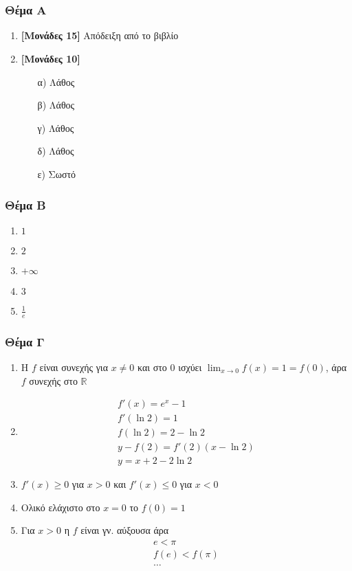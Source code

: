 \documentclass[12pt]{article}
\begin{document}
\part*{}

\section*{Θέμα Α}
  \noindent
  \begin{enumerate}
    \item \textbf{[Μονάδες 15]} Απόδειξη από το βιβλίο
    \item \textbf{[Μονάδες 10]}
    \begin{enumerate}
      \item [α)] Λάθος
      \item [β)] Λάθος
      \item [γ)] Λάθος
      \item [δ)] Λάθος
      \item [ε)] Σωστό
    \end{enumerate}
  \end{enumerate}

\section*{Θέμα Β}
  \noindent
  \begin{enumerate}
    \item $1$
    \item $2$
    \item $+\infty$
    \item $3$
    \item $\frac{1}{e}$
  \end{enumerate}

\section*{Θέμα Γ}
  \noindent
  \begin{enumerate}
    \item Η $f$ είναι συνεχής για $x\ne0$ και στο $0$ ισχύει $\lim_{x\to 0}f(x)=1=f(0)$, άρα $f$ συνεχής στο $\mathbb{R}$
    \item \begin{gather*}f'(x)=e^x-1 \\ f'(\ln2)=1 \\ f(\ln2)=2-\ln2 \\ y-f(2)=f'(2)(x-\ln2) \\ y=x+2-2\ln2 \end{gather*}
    \item $f'(x) \ge 0$ για $x>0$ και $f'(x) \le 0$ για $x<0$
    \item Ολικό ελάχιστο στο $x=0$ το $f(0)=1$
    \item Για $x>0$ η $f$ είναι γν. αύξουσα άρα \begin{gather*}e<\pi \\ f(e)<f(\pi) \\ \ldots \end{gather*}
  \end{enumerate}
\end{document}
